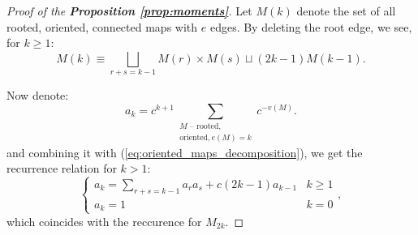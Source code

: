 \documentclass{article}
\newcommand{\apply}[2]{\left\langle#1, #2\right\rangle}
\begin{document}
\begin{proof}[Proof of the \textbf{Proposition \ref{prop:moments}}]
    Let $M(k)$ denote the set of all rooted, oriented, connected maps with $e$ edges. By deleting the root edge, we see, for $k \geq 1$:
    \begin{equation}\label{eq:oriented_maps_decomposition}
        M(k) \equiv \bigsqcup_{r + s = k - 1}M(r)\times M(s) \sqcup (2k - 1)M(k - 1).
    \end{equation}

    Now denote:
    $$
        a_k = c^{k + 1}\sum\limits_{\substack{\text{$M$ -- rooted, } \\ \text{oriented}, e(M) = k}}c^{-v(M)}.
    $$
    and combining it with (\ref{eq:oriented_maps_decomposition}), we get the recurrence relation for $k > 1$:
    \begin{equation}
        \begin{cases}
            a_k = \sum\limits_{r + s = k - 1}a_ra_s + c(2k - 1)a_{k - 1} & k \geq 1 \\
            a_k = 1 & k = 0
        \end{cases},
    \end{equation}
    which coincides with the reccurence for $M_{2k}$.
\end{proof}




\end{document}
